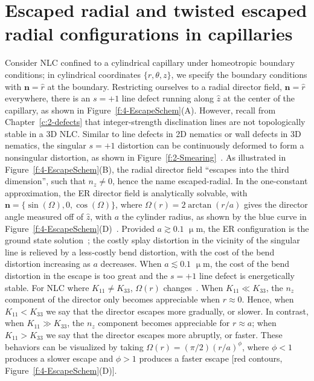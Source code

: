 \section{Escaped radial and twisted escaped radial configurations in capillaries}
Consider NLC confined to a cylindrical capillary under homeotropic boundary conditions; in cylindrical coordinates $\{r,\theta,z\}$, we specify the boundary conditions with $\mathbf{n} = \hat{r}$ at the boundary.
Restricting ourselves to a radial director field, $\mathbf{n} = \hat{r}$ everywhere, there is an $s = +1$ line defect running along $\hat{z}$ at the center of the capillary, as shown in Figure~\ref{f:4-EscapeSchem}(A).
However, recall from Chapter~\ref{c:2-defects} that integer-strength disclination lines are not topologically stable in a 3D NLC.
Similar to line defects in 2D nematics or wall defects in 3D nematics, the singular $s = +1$ distortion can be continuously deformed to form a nonsingular distortion, as shown in Figure~\ref{f:2-Smearing}~\cite{RN179,RN290,RN289}.
As illustrated in Figure~\ref{f:4-EscapeSchem}(B), the radial director field ``escapes into the third dimension'', such that  $n_{z} \neq 0$, hence the name escaped-radial.
In the one-constant approximation, the ER director field is analytically solvable, with $\mathbf{n} = \{\sin(\Omega),0,\cos(\Omega)\}$, where $\Omega(r) = 2 \arctan(r/a)$ gives the director angle measured off of $\hat{z}$, with $a$ the cylinder radius, as shown by the blue curve in Figure~\ref{f:4-EscapeSchem}(D)~\cite{RN179,RN290}.
Provided $a \gtrsim 0.1$ $\upmu$m, the ER configuration is the ground state solution~\cite{RN194}; the costly splay distortion in the vicinity of the singular line is relieved by a less-costly bend distortion, with the cost of the bend distortion increasing as $a$ decreases.
When $a \lesssim 0.1$ $\upmu$m, the cost of the bend distortion in the escape is too great and the $s = +1$ line defect is energetically stable.
For NLC where $K_{11} \neq K_{33}$, $\Omega(r)$ changes~\cite{RN321}.
When $K_{11} \ll K_{33}$, the $n_z$ component of the director only becomes appreciable when $r \approx 0$.
Hence, when $K_{11} < K_{33}$ we say that the director escapes more gradually, or slower.
In contrast,  when $K_{11} \gg K_{33}$, the $n_z$ component becomes appreciable for $r \approx a$; when $K_{11} > K_{33}$ we say that the director escapes more abruptly, or faster.
These behaviors can be visualized by taking $\Omega(r) = (\pi/2)(r/a)^{\phi}$, where $\phi < 1$ produces a slower escape and $\phi > 1$ produces a faster escape [red contours, Figure~\ref{f:4-EscapeSchem}(D)].

